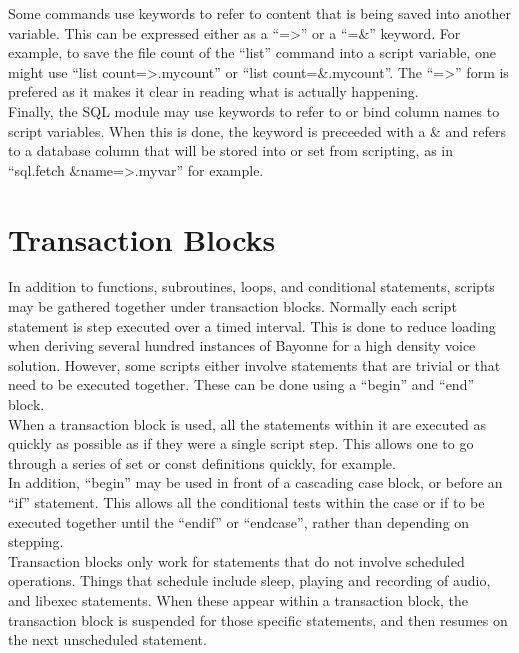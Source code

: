 \documentclass[a4paper,12pt]{article}
\begin{document}
Some commands use keywords to refer to content that is being saved into 
another variable.  This can be expressed either as a ``=>'' or a ``=\&'' 
keyword.  For example, to save the file count of the ``list'' command 
into a script variable, one might use ``list count=>.mycount'' or 
``list count=\&.mycount''.  The ``=>'' form is prefered as it makes it 
clear in reading what is actually happening. \\

Finally, the SQL module may use keywords to refer to or bind column 
names to script variables.  When this is done, the keyword is preceeded 
with a \& and refers to a database column that will be stored into or 
set from scripting, as in ``sql.fetch \&name=>.myvar'' for example. \\

\section{Transaction Blocks}

In addition to functions, subroutines, loops, and conditional
statements, scripts may be gathered together under transaction blocks. 
Normally each script statement is step executed over a timed interval. 
This is done to reduce loading when deriving several hundred instances
of Bayonne for a high density voice solution.  However, some scripts
either involve statements that are trivial or that need to be executed
together.  These can be done using a ``begin'' and ``end'' block. \\

When a transaction block is used, all the statements within it are 
executed as quickly as possible as if they were a single script step.  
This allows one to go through a series of set or const definitions 
quickly, for example. \\

In addition, ``begin'' may be used in front of a cascading case block, or 
before an ``if'' statement.  This allows all the conditional tests within 
the case or if to be executed together until the ``endif'' or 
``endcase'', rather than depending on stepping. \\

Transaction blocks only work for statements that do not involve scheduled 
operations.  Things that schedule include sleep, playing and recording of 
audio, and libexec statements.  When these appear within a transaction 
block, the transaction block is suspended for those specific statements, 
and then resumes on the next unscheduled statement. \\ 
\end{document}
